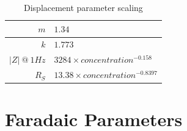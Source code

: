 \documentclass[journal, a4paper]{IEEEtran}
\begin{document}
\begin{table}
    \begin{center}
        \begin{tabular}{|r|l|}
            \hline
            $m$ & $1.34$ \\ \hline
            $k$ & $1.773$\\ \hline
            $|Z|\: @\: 1Hz$& $3284 \times concentration^{-0.158}$ \\ \hline
            $R_{S}$ & $13.38 \times concentration^{-0.8397} $\\ \hline
        \end{tabular}
    \end{center}
    \caption{Displacement parameter scaling}
    \label{tab:CPEparams}
\end{table}



\section{Faradaic Parameters}
\end{document}
